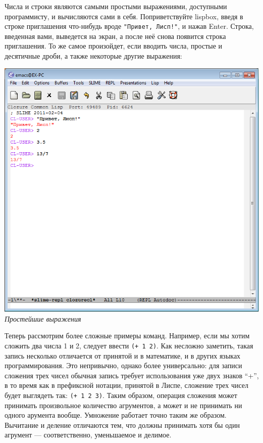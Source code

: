 \documentclass[a4paper, 12pt, titlepage, twoside]{article}
\begin{document}
Числа и строки являются самыми простыми выражениями, доступными программисту, и вычисляются сами в себя. Поприветствуйте lispbox, введя в строке приглашения что-нибудь вроде \verb|"Привет, Лисп!"|, и нажав Enter. Строка, введенная вами, выведется на экран, а после неё снова появится строка приглашения. То же самое произойдет, если вводить числа, простые и десятичные дроби, а также некоторые другие выражения:
\begin{center}
  \includegraphics[scale=.7]{lispbox_toplevel}\\
  \small{\textit{Простейшие выражения}}
\end{center}
Теперь рассмотрим более сложные примеры команд. Например, если мы хотим сложить два числа 1 и 2, следует ввести \verb|(+ 1 2)|. Как несложно заметить, такая запись несколько отличается от принятой и в математике, и в других языках программирования. Это непривычно, однако более универсально: для записи сложения трех чисел обычная запись требует использования уже двух знаков ``+'', в то время как в префиксной нотации, принятой в Лиспе, сложение трех чисел будет выглядеть так: \verb|(+ 1 2 3)|. Таким образом, операция сложения может принимать произвольное количество агрументов, а может и не принимать ни одного арумента вообще. Умножение работает точно таким же образом. Вычитание и деление отличаются тем, что должны принимать хотя бы один агрумент --- соответственно, уменьшаемое и делимое.
\end{document}
